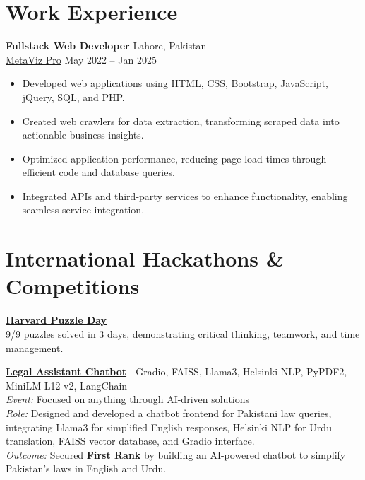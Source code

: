 \documentclass[a4paper,12pt]{article}
\begin{document}

\section{Work Experience}

\textbf{Fullstack Web Developer} \hfill Lahore, Pakistan \\
\href{https://metaviz.pro/}{MetaViz Pro} \hfill May 2022 -- Jan 2025

\begin{itemize}[leftmargin=*]
    \item Developed web applications using HTML, CSS, Bootstrap, JavaScript, jQuery, SQL, and PHP.
    \item Created web crawlers for data extraction, transforming scraped data into actionable business insights.
    \item Optimized application performance, reducing page load times through efficient code and database queries.
    \item Integrated APIs and third-party services to enhance functionality, enabling seamless service integration.
\end{itemize}

\section{International Hackathons \& Competitions}

\textbf{\href{https://www.linkedin.com/posts/muhammad-qasim-gill_cs50-harvard-puzzleday2025-activity-7316559580790972418-4B6G?utm_source=share&utm_medium=member_desktop&rcm=ACoAACG6gOwBnlfoWP0KSUXYMZV0hE4WXwmWsBQ}{Harvard Puzzle Day}} \\
9/9 puzzles solved in 3 days, demonstrating critical thinking, teamwork, and time management.

\vspace{0.5em}

\textbf{\href{https://www.linkedin.com/feed/update/urn:li:activity:7304649229472309248/}{Legal Assistant Chatbot}} 
$|$ Gradio, FAISS, Llama3, Helsinki NLP, PyPDF2, MiniLM-L12-v2, LangChain \\
\textit{Event:} Focused on anything through AI-driven solutions \\
\textit{Role:} Designed and developed a chatbot frontend for Pakistani law queries, integrating Llama3 for simplified English responses, Helsinki NLP for Urdu translation, FAISS vector database, and Gradio interface. \\
\textit{Outcome:} Secured \textbf{First Rank} by building an AI-powered chatbot to simplify Pakistan’s laws in English and Urdu.
\end{document}
